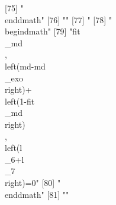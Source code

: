 [75] "\\end{dmath}"                                                                                                                                                                                                                                                                                  
[76] ""                                                                                                                                                                                                                                                                                              
[77] "%
[78] "\\begin{dmath}"                                                                                                                                                                                                                                                                                
[79] "{{fit\\_md}}\\, \\left({md}-{{md\\_exo}}\\right)+\\left(1-{{fit\\_md}}\\right)\\, \\left({{l\\_6}}+{{l\\_7}}\\right)=0"                                                                                                                                                                        
[80] "\\end{dmath}"                                                                                                                                                                                                                                                                                  
[81] ""                                                                                                                                                                                                                                                                                              
